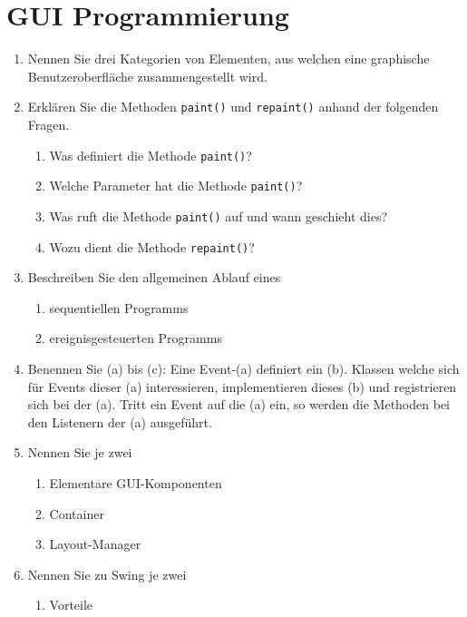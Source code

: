 \newpage
\section{GUI Programmierung}

\begin{enumerate}
    \item Nennen Sie drei Kategorien von Elementen, aus welchen eine
        graphische Benutzeroberfläche zusammengestellt wird.
    \item Erklären Sie die Methoden \verb?paint()? und \verb?repaint()?
        anhand der folgenden Fragen.
        \begin{enumerate}[label=(\alph*)]
            \item Was definiert die Methode \verb?paint()??
            \item Welche Parameter hat die Methode \verb?paint()??
            \item Was ruft die Methode \verb?paint()? auf und wann 
                geschieht dies?
            \item Wozu dient die Methode \verb?repaint()??
        \end{enumerate}
    \item Beschreiben Sie den allgemeinen Ablauf eines 
        \begin{enumerate}[label=(\alph*)]
            \item sequentiellen Programms
            \item ereignisgesteuerten Programms
        \end{enumerate}
    \item Benennen Sie (a) bis (c): Eine Event-(a) definiert ein (b).
        Klassen welche sich für Events dieser (a) interessieren, 
        implementieren dieses (b) und registrieren sich bei der (a).
        Tritt ein Event auf die (a) ein, so werden die Methoden bei
        den Listenern der (a) ausgeführt.
    \item Nennen Sie je zwei
        \begin{enumerate}[label=(\alph*)]
            \item Elementare GUI-Komponenten
            \item Container
            \item Layout-Manager
        \end{enumerate}
    \item Nennen Sie zu Swing je zwei 
        \begin{enumerate}[label=(\alph*)]
            \item Vorteile

\end{enumerate}
\end{enumerate}
